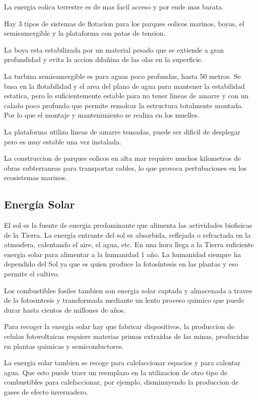 \documentclass[runningheads]{llncs}
\begin{document}
La energia eolica terrestre es de mas facil acceso y por ende mas barata.

Hay 3 tipos de sistemas de flotacion para los parques eolicos marinos, boyas, el semisumergible y la plataforma con patas de tension.

La boya esta estabilizada por un material pesado que se extiende a gran profundidad y evita la accion ddañina de las olas en la superficie.

La turbina semisumergible es para aguas poco profundas, hasta 50 metros. Se basa en la flotabilidad y el area del plano de agua para mantener la estabilidad estatica, pero lo suficientemente estable para no tener lineas de amarre y con un calado poco profundo que permite remolcar la estructura totalmente montada.
Por lo que el montaje y mantenimiento se realiza en los muelles.

La plataforma utiliza lineas de amarre tensadas, puede ser dificil de desplegar pero es muy estable una vez instalada. 

La construccion de parques eolicos en alta mar requiere muchos kilometros de obras subterraneas para transportar cables, lo que provoca pertubaciones en los ecosistemas marinos.

\subsection{Energía Solar}

El sol es la fuente de energia predominante que alimenta las actividades biofisicas de la Tierra. La energía entrante del sol es absorbida, reflejada o refractada en la atmosfera, calentando el aire, el agua, etc. En una hora llega a la Tierra suficiente energia solar para alimentar a la humanidad 1 año.
La humanidad siempre ha dependido del Sol ya que es quien produce la fotosíntesis en las plantas y eso permite el cultivo.

Los combustibles fosiles tambien son energia solar captada y almacenada a traves de la fotosintesis y transformada mediante un lento proceso quimico que puede durar hasta cientos de millones de años.

Para recoger la energia solar hay que fabricar dispositivos, la produccion de celulas fotovoltaicas requiere materias primas extraidas de las minas, producidas en plantas quimicas y semiconductores.

La energia solar tambien se recoge para calefaccionar espacios y para calentar agua. Que esto puede traer un reemplazo en la utilizacion de otro tipo de combustibles para calefaccionar, por ejemplo, disminuyendo la produccion de gases de efecto invernadero.
\end{document}
